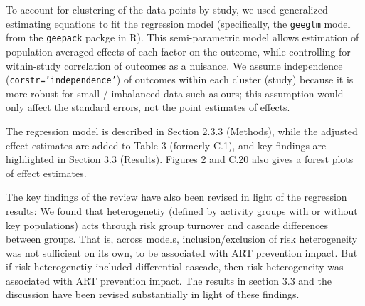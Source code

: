 \begin{comment}\label{reg.2}
A related concern is that the tests for statistically significant differences in the univariable analysis appear problematic. When you use the Kruskal-Wallis test you are assuming independence of observations. But here the observations are not statistically independent of one another - in many cases multiple observations are being taken from the same study (and there is likely to be a high degree of within-study correlation). By not taking into account the within-study correlation I think you exaggerate the significance of the differences between model types. That might explain some of the odd results in Table C1 (for example a statistically significant positive relationship between HCT behaviour change and the incidence reduction, but a significant negative relationship between HCT behaviour change and the cumulative \% of infections averted). If you use a meta-regression approach, you should be able to control for the within-study correlation.
\end{comment}
\begin{response}
To account for clustering of the data points by study, we used generalized estimating equations to fit the regression model
(specifically, the \texttt{geeglm} model from the \texttt{geepack} packge in R).
This semi-parametric model allows estimation of population-averaged effects of each factor on the outcome, %
while controlling for within-study correlation of outcomes as a nuisance.
We assume independence (\texttt{corstr='independence'}) of outcomes within each cluster (study) because it is more robust for small / imbalanced data such as ours;
this assumption would only affect the standard errors, not the point estimates of effects.
\par
The regression model is described in Section 2.3.3 (Methods),
while the adjusted effect estimates are added to Table 3 (formerly C.1),
and key findings are highlighted in Section 3.3 (Results).
Figures 2 and C.20 also gives a forest plots of effect estimates.
\par
The key findings of the review have also been revised in light of the regression results:
We found that heterogenetiy (defined by activity groups with or without key populations) acts through risk group turnover and cascade differences between groups.
That is, across models, inclusion/exclusion of risk heterogeneity was not sufficient on its own, to be associated with ART prevention impact. 
But if risk heterogenetiy included differential cascade, then risk heterogeneity was associated with ART prevention impact.
The results in section 3.3 and the discussion have been revised substantially in light of these findings.
\end{response}
